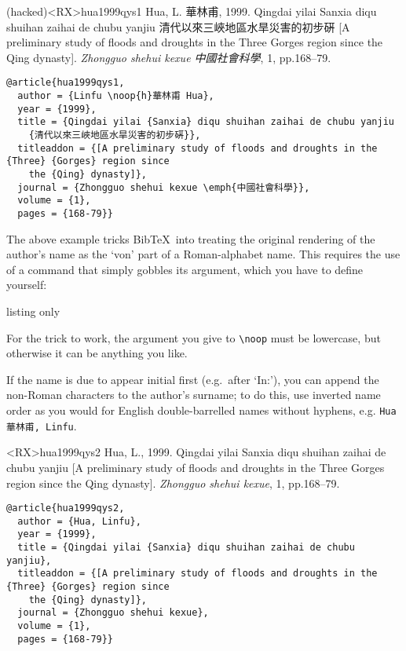 \documentclass[10pt,a4paper]{article}
\newenvironment{tips}{%
  \begin{list}{\makebox[2em][c]{\faLightbulbO}}{%
    \setlength{\leftmargin}{2em}
    \setlength{\labelwidth}{2em}
    \setlength{\labelsep}{0pt}}
}{\end{list}}
\begin{document}
\newcommand*{\noop}[1]{}
\begin{bibexbox}(hacked)<RX>{hua1999qys1}
  Hua, L. 華林甫, 1999. Qingdai yilai Sanxia diqu shuihan zaihai de chubu yanjiu 清代以來三峽地區水旱災害的初步硏 [A preliminary study of floods and droughts in the Three Gorges region since the Qing dynasty]. \emph{Zhongguo shehui kexue \emph{中國社會科學}}, 1, pp.168--79.
  \tcblower
\begin{Verbatim}
@article{hua1999qys1,
  author = {Linfu \noop{h}華林甫 Hua},
  year = {1999},
  title = {Qingdai yilai {Sanxia} diqu shuihan zaihai de chubu yanjiu
    {清代以來三峽地區水旱災害的初步硏}},
  titleaddon = {[A preliminary study of floods and droughts in the {Three} {Gorges} region since
    the {Qing} dynasty]},
  journal = {Zhongguo shehui kexue \emph{中國社會科學}},
  volume = {1},
  pages = {168-79}}
\end{Verbatim}
\end{bibexbox}

\begin{tips}\item
The above example tricks Bib\TeX\ into treating the original rendering of
the author's name as the `von' part of a Roman-alphabet name. This requires the
use of a command that simply gobbles its argument, which you have to define
yourself:

\begin{tcblisting}{listing only}
\newcommand*{\noop}[1]{}
\end{tcblisting}

For the trick to work, the argument you give to \lstinline[style=dtxlatex]|\noop|
must be lowercase, but otherwise it can be anything you like.
\item
If the name is due to appear initial first (e.g.~after `In:'), you can append
the non-Roman characters to the author's surname; to do this, use inverted name
order as you would for English double-barrelled names without hyphens, e.g.\@
\texttt{Hua 華林甫, Linfu}.
\end{tips}

\begin{bibexbox}<RX>{hua1999qys2}
  Hua, L., 1999. Qingdai yilai Sanxia diqu shuihan zaihai de chubu yanjiu [A preliminary study of floods and droughts in the Three Gorges region since the Qing dynasty]. \emph{Zhongguo shehui kexue}, 1, pp.168--79.
  \tcblower
\begin{Verbatim}
@article{hua1999qys2,
  author = {Hua, Linfu},
  year = {1999},
  title = {Qingdai yilai {Sanxia} diqu shuihan zaihai de chubu yanjiu},
  titleaddon = {[A preliminary study of floods and droughts in the {Three} {Gorges} region since
    the {Qing} dynasty]},
  journal = {Zhongguo shehui kexue},
  volume = {1},
  pages = {168-79}}
\end{Verbatim}
\end{bibexbox}
\end{document}
